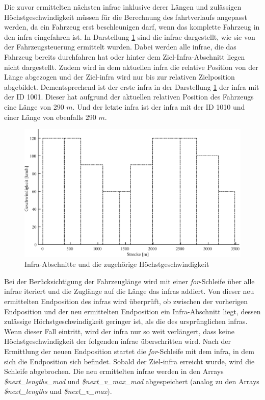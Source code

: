 Die zuvor ermittelten nächsten \ac{infra}e inklusive derer Längen und zulässigen Höchstgeschwindigkeit müssen für die Berechnung des \Gls{fahrtverlauf}s angepasst werden, da ein Fahrzeug erst beschleunigen darf, wenn das komplette Fahrzeug in den \ac{infra} eingefahren ist. In Darstellung \ref{fig:it1} sind die \ac{infra}e dargestellt, wie sie von der Fahrzeugsteuerung ermittelt wurden. Dabei werden \mbox{alle} \ac{infra}e, die das Fahrzeug bereits durchfahren hat oder hinter dem Ziel-Infra-Abschnitt liegen nicht dargestellt. Zudem wird in dem aktuellen \ac{infra} die relative Position von der Länge abgezogen und der Ziel-\ac{infra} wird nur bis zur relativen Zielposition abgebildet. Dementsprechend ist der erste \ac{infra} in der Darstellung \ref{fig:it1} der \ac{infra} mit der ID 1001. Dieser hat aufgrund der aktuellen relativen Position des Fahrzeugs eine Länge von 290 $m$. Und der letzte \ac{infra} ist der \ac{infra} mit der ID 1010 und einer Länge von ebenfalls 290 $m$.
\begin{figure}
  \includegraphics[width=\linewidth]{../images/matlab/it1.pdf}
  \caption{Infra-Abschnitte und die zugehörige Höchstgeschwindigkeit}
  \label{fig:it1}
\end{figure}

Bei der Berücksichtigung der Fahrzeuglänge wird mit einer \textit{for}-Schleife über \mbox{alle} \ac{infra}e iteriert und die Zuglänge auf die Länge das \ac{infra}s addiert. Von dieser neu ermittelten Endposition des \ac{infra}s wird überprüft, ob zwischen der vorherigen Endposition und der neu ermittelten Endposition ein Infra-Abschnitt liegt, dessen zulässige Höchstgeschwindigkeit geringer ist, als die des ursprünglichen \ac{infra}s. Wenn dieser Fall eintritt, wird der \ac{infra} nur so weit verlängert, dass keine Höchstgeschwindigkeit der folgenden \ac{infra}e überschritten wird. Nach der Ermittlung der neuen Endposition startet die \textit{for}-Schleife mit dem \ac{infra}, in dem sich die Endposition sich befindet. Sobald der Ziel-\ac{infra} erreicht wurde, wird die Schleife abgebrochen. Die neu ermittelten \ac{infra}e werden in den Arrays \textit{\$next\_lengths\_mod} und \textit{\$next\_v\_max\_mod} abgespeichert (analog zu den Arrays \textit{\$next\_lengths} und \textit{\$next\_v\_max}). 


